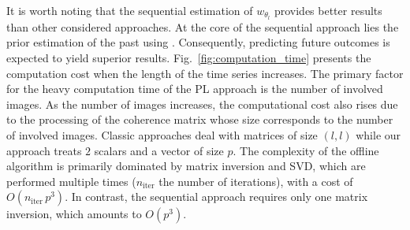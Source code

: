 It is worth noting that the sequential estimation of $w_{\theta_{l}}$ provides better results than other considered approaches. At the core of the sequential approach lies the prior estimation of the past using \citep{vu2022new}. Consequently, predicting future outcomes is expected to yield superior results.
Fig.~\ref{fig:computation_time} presents the computation cost when the length of the time series increases. The primary factor for the heavy computation time of the \acs{PL} approach is the number of involved images. As the number of images increases, the computational cost also rises due to the processing of the coherence matrix whose size corresponds to the number of involved images. Classic approaches deal with matrices of size $(l, l)$ while our approach treats $2$ scalars and a vector of size $p$. 
The complexity of the offline algorithm is primarily dominated by matrix inversion and \ac{SVD}, which are performed multiple times ($n_{\text{iter}}$ the number of iterations), with a cost of $O(n_{\text{iter}} \, p^3)$. In contrast, the sequential approach requires only one matrix inversion, which amounts to $O(p^3)$.
